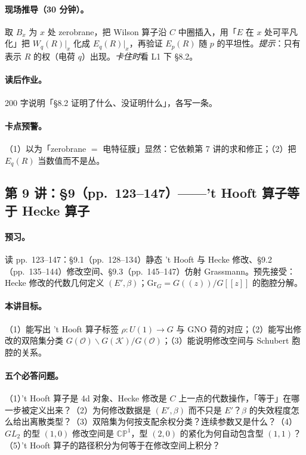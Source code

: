 {\paragraph{现场推导（30 分钟）。}取 \(B_x\) 为 \(x\) 处 zerobrane，把 Wilson 算子沿 \(C\) 中圈插入，用「\(E\) 在 \(x\) 处可平凡化」把 \(W_q(R)|_x\) 化成 \(E_q(R)|_x\)，再验证 \(E_p(R)\) 随 \(p\) 的平坦性。\emph{提示}：只有表示 \(R\) 的权（电荷 \(q\)）出现。\emph{卡住时}看 L1 下 §8.2。\pC

\paragraph{读后作业。}200 字说明「§8.2 证明了什么、没证明什么」，各写一条。\pC

\paragraph{卡点预警。}（1）以为「zerobrane \(=\) 电特征膜」显然：它依赖第 7 讲的求和修正；（2）把 \(E_q(R)\) 当数值而不是丛。\pC

\subsection{第 9 讲：\S9（pp.~123--147）——\texorpdfstring{'t Hooft}{'t Hooft} 算子等于 Hecke 算子}

\paragraph{预习。}读 pp.~123--147：§9.1（pp.~128--134）静态 't Hooft 与 Hecke 修改、§9.2（pp.~135--144）修改空间、§9.3（pp.~145--147）仿射 Grassmann。预先接受：Hecke 修改的代数几何定义 \((E',\beta)\)；\(\mathrm{Gr}_G=G((z))/G[[z]]\) 的胞腔分解。\pC

\paragraph{本讲目标。}（1）能写出 't Hooft 算子标签 \(\rho:U(1)\to G\) 与 GNO 荷的对应；（2）能写出修改的双陪集分类 \(G(\mathcal O)\backslash G(\mathcal K)/G(\mathcal O)\)；（3）能说明修改空间与 Schubert 胞腔的关系。\pC

\paragraph{五个必答问题。}（1）'t Hooft 算子是 4d 对象、Hecke 修改是 \(C\) 上一点的代数操作，「等于」在哪一步被定义出来？（2）为何修改数据是 \((E',\beta)\) 而不只是 \(E'\)？\(\beta\) 的失效程度怎么给出离散类型？（3）双陪集为何按支配余权分类？连续参数又是什么？（4）\(GL_2\) 的型 \((1,0)\) 修改空间是 \(\mathbb{CP}^1\)，型 \((2,0)\) 的紧化为何自动包含型 \((1,1)\)？（5）'t Hooft 算子的路径积分为何等于在修改空间上积分？\pC

}
